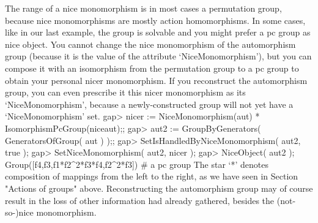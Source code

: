 %

The range of  a nice monomorphism is  in most cases a permutation  group,
because  nice monomorphisms  are mostly action  homomorphisms. In some
cases,  like in  our last example,  the  group is solvable  and you might
prefer a pc group as nice object. You cannot change the nice monomorphism
of  the automorphism  group (because it  is   the value  of the attribute
`NiceMonomorphism'), but you can compose  it with an isomorphism from the
permutation  group to  a  pc   group  to   obtain your  personal    nicer
monomorphism. If  you reconstruct  the automorphism  group,  you can even
prescribe it this nicer monomorphism as its `NiceMonomorphism', because a
newly-constructed group will not yet have a `NiceMonomorphism' set.
\beginexample
gap> nicer := NiceMonomorphism(aut) * IsomorphismPcGroup(niceaut);;
gap> aut2 := GroupByGenerators( GeneratorsOfGroup( aut ) );;
gap> SetIsHandledByNiceMonomorphism( aut2, true );
gap> SetNiceMonomorphism( aut2, nicer );
gap> NiceObject( aut2 );
Group([f4,f3,f1*f2^2*f3*f4,f2^2*f3]) # a pc group
\endexample
The star `*' denotes composition of mappings  from the left to the right,
as we  have  seen in  Section "Actions of  groups" above.
Reconstructing the
automorphism group may of course result in the  loss of other information
{\GAP} had already gathered, besides the (not-so-)nice monomorphism.

%


